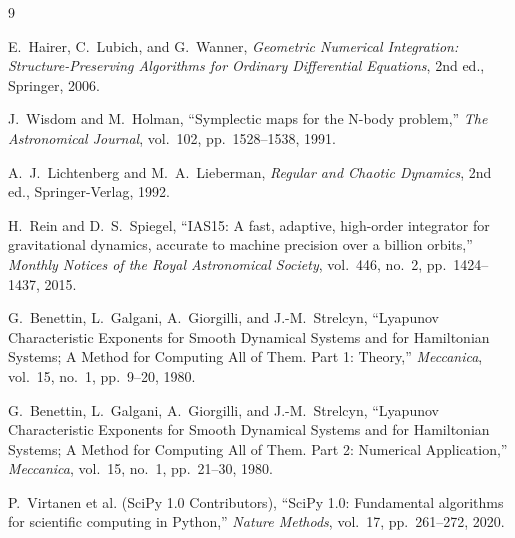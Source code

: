 \documentclass[10pt,letterpaper,twocolumn]{article}
\begin{document}
\begin{thebibliography}{9}
\small

E.~Hairer, C.~Lubich, and G.~Wanner,
\emph{Geometric Numerical Integration: Structure-Preserving Algorithms for Ordinary Differential Equations},
2nd ed., Springer, 2006.

J.~Wisdom and M.~Holman,
``Symplectic maps for the N-body problem,''
\emph{The Astronomical Journal},
vol.~102, pp.~1528--1538, 1991.

A.~J.~Lichtenberg and M.~A.~Lieberman,
\emph{Regular and Chaotic Dynamics},
2nd ed., Springer-Verlag, 1992.

H.~Rein and D.~S.~Spiegel,
``IAS15: A fast, adaptive, high-order integrator for gravitational dynamics, accurate to machine precision over a billion orbits,''
\emph{Monthly Notices of the Royal Astronomical Society},
vol.~446, no.~2, pp.~1424--1437, 2015.

G.~Benettin, L.~Galgani, A.~Giorgilli, and J.-M.~Strelcyn,
``Lyapunov Characteristic Exponents for Smooth Dynamical Systems and for Hamiltonian Systems; A Method for Computing All of Them. Part 1: Theory,''
\emph{Meccanica},
vol.~15, no.~1, pp.~9--20, 1980.

G.~Benettin, L.~Galgani, A.~Giorgilli, and J.-M.~Strelcyn,
``Lyapunov Characteristic Exponents for Smooth Dynamical Systems and for Hamiltonian Systems; A Method for Computing All of Them. Part 2: Numerical Application,''
\emph{Meccanica},
vol.~15, no.~1, pp.~21--30, 1980.

P.~Virtanen et al. (SciPy 1.0 Contributors),
``SciPy 1.0: Fundamental algorithms for scientific computing in Python,''
\emph{Nature Methods},
vol.~17, pp.~261--272, 2020.

\end{thebibliography}
\end{document}
